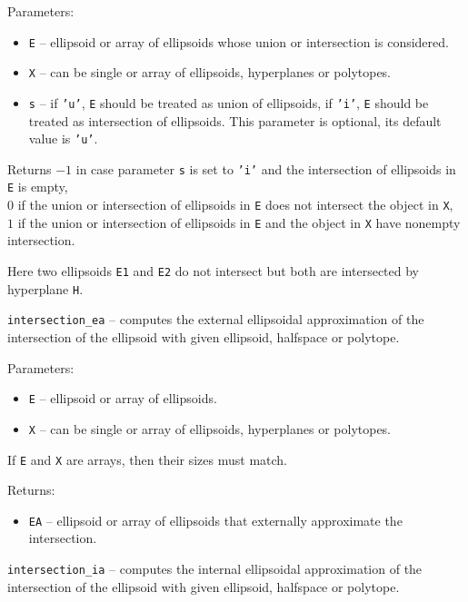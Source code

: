 Parameters:
\begin{itemize}
\item {\tt E} -- ellipsoid or array of ellipsoids whose union or intersection
is considered.
\item {\tt X} -- can be single or array of ellipsoids, hyperplanes or polytopes.
\item {\tt s} -- if {\tt 'u'}, {\tt E} should be treated as union of ellipsoids,
if {\tt 'i'}, {\tt E} should be treated as intersection of ellipsoids.
This parameter is optional, its default value is {\tt 'u'}.
\end{itemize}

Returns $-1$ in case parameter {\tt s} is set to {\tt 'i'} and the
intersection of ellipsoids in {\tt E} is empty,\\
$0$ if the union or intersection of ellipsoids in {\tt E} does not intersect
the object in {\tt X},\\
$1$ if the union or intersection of ellipsoids in {\tt E} and the object
in {\tt X} have nonempty intersection.


Here two ellipsoids {\tt E1} and {\tt E2} do not intersect but both are
intersected by hyperplane {\tt H}.

\newpage

{\Large {\tt intersection\_ea}} -- computes the external ellipsoidal
approximation of the intersection of the ellipsoid with given ellipsoid,
halfspace or polytope.

Parameters:
\begin{itemize}
\item {\tt E} -- ellipsoid or array of ellipsoids.
\item {\tt X} -- can be single or array of ellipsoids, hyperplanes or polytopes.
\end{itemize}
If {\tt E} and {\tt X} are arrays, then their sizes must match.

Returns:
\begin{itemize}
\item {\tt EA} -- ellipsoid or array of ellipsoids that externally approximate
the intersection.
\end{itemize}



\newpage

{\Large {\tt intersection\_ia}} -- computes the internal ellipsoidal
approximation of the intersection of the ellipsoid with given ellipsoid,
halfspace or polytope.

